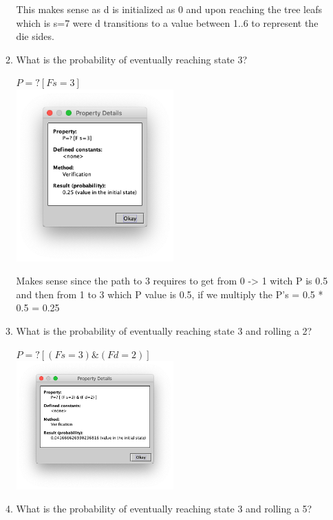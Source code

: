 \documentclass{article}
\begin{document}
\begin{enumerate}
\begin{enumerate}
\begin{center}
  \end{center}
  This makes sense as d is initialized as 0 and upon reaching the tree leafs which is s=7 were d transitions to a value between 1..6 to represent the die sides.\\
\item What is the probability of eventually reaching state 3?
  \begin{center}
    $P=? [ F s=3]$\\
    \includegraphics[width=0.5\textwidth]{p2d}\\
  \end{center}
  Makes sense since the path to 3 requires to get from 0 -> 1 witch P is 0.5 and then from 1 to 3 which P value is 0.5, if we multiply the P's = 0.5 * 0.5 = 0.25
\item What is the probability of eventually reaching state 3 and rolling a 2?
    \begin{center}
     $P=? [ (F s=3) \& (F d=2) ]$\\
    \includegraphics[width=0.5\textwidth]{s3d2}\\
    \end{center}
\item What is the probability of eventually reaching state 3 and rolling a 5?
  \begin{center}

\end{center}
\end{enumerate}
\end{enumerate}
\end{document}
